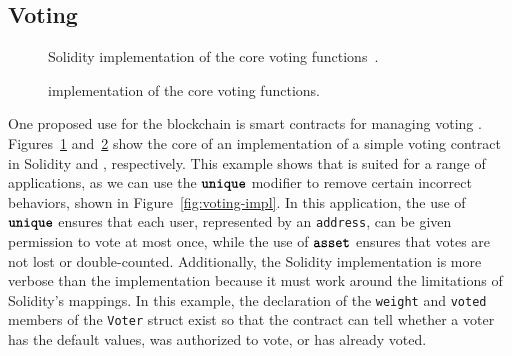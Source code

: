 \documentclass[dvipsnames, usenames, sigconf]{acmart}
\begin{document}
\subsection{Voting}\label{sec:voting-impl}
\begin{figure*}[ht]
    \centering
    \begin{subfigure}[t]{0.49\textwidth}
        \centering
        
        \caption{Solidity implementation of the core voting functions~\cite{solidityByExample}.}
        \label{fig:voting-impl-sol}
    \end{subfigure}%
    \hfill
    \begin{subfigure}[t]{0.49\textwidth}
        \centering
        
        \caption{\langName implementation of the core voting functions.}
        \label{fig:voting-impl-flow}
    \end{subfigure}
    \caption{A voting contract with a set of proposals, for which each user must first be given permission to vote by the chairperson, assigned in the constructor of the contract (not shown).
    Each user can vote exactly once for exactly one proposal.
    The proposal with the most votes wins.}
    \label{fig:voting-impl}
\end{figure*}
One proposed use for the blockchain is smart contracts for managing voting .
Figures~\ref{fig:voting-impl-sol} and~\ref{fig:voting-impl-flow} show the core of an implementation of a simple voting contract in Solidity and \langName, respectively.
This example shows that \langName is suited for a range of applications, as we can use the $\textbf{\texttt{unique}}$ modifier to remove certain incorrect behaviors, shown in Figure~\ref{fig:voting-impl}.
In this application, the use of $\textbf{\texttt{unique}}$ ensures that each user, represented by an \lstinline{address}, can be given permission to vote at most once, while the use of $\textbf{\texttt{asset}}$ ensures that votes are not lost or double-counted.
Additionally, the Solidity implementation is more verbose than the \langName implementation because it must work around the limitations of Solidity's mappings.
In this example, the declaration of the \lstinline{weight} and \lstinline{voted} members of the \lstinline{Voter} struct exist so that the contract can tell whether a voter has the default values, was authorized to vote, or has already voted.
\end{document}
